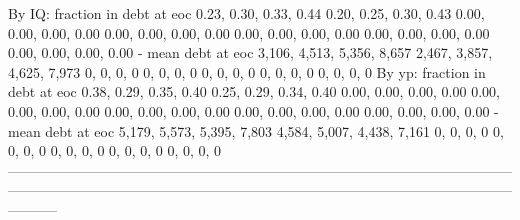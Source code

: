         By IQ: fraction in debt at eoc      0.23, 0.30, 0.33, 0.44      0.20, 0.25, 0.30, 0.43   0.00, 0.00, 0.00, 0.00     0.00, 0.00, 0.00, 0.00         0.00, 0.00, 0.00, 0.00   0.00, 0.00, 0.00, 0.00   0.00, 0.00, 0.00, 0.00
                    - mean debt at eoc  3,106, 4,513, 5,356, 8,657  2,467, 3,857, 4,625, 7,973               0, 0, 0, 0                 0, 0, 0, 0                     0, 0, 0, 0               0, 0, 0, 0               0, 0, 0, 0
        By yp: fraction in debt at eoc      0.38, 0.29, 0.35, 0.40      0.25, 0.29, 0.34, 0.40   0.00, 0.00, 0.00, 0.00     0.00, 0.00, 0.00, 0.00         0.00, 0.00, 0.00, 0.00   0.00, 0.00, 0.00, 0.00   0.00, 0.00, 0.00, 0.00
                    - mean debt at eoc  5,179, 5,573, 5,395, 7,803  4,584, 5,007, 4,438, 7,161               0, 0, 0, 0                 0, 0, 0, 0                     0, 0, 0, 0               0, 0, 0, 0               0, 0, 0, 0
-----------------------------------------------------------------------------------------------------------------------------------------------------------------------------------------------------------------------------------
